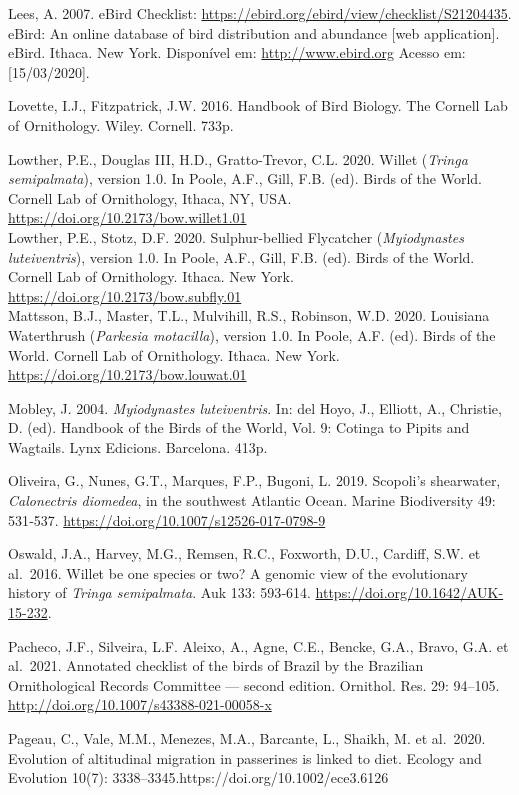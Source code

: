 \documentclass[
  oneside]{scrbook}
\begin{document}
Lees, A. 2007. eBird Checklist: \url{https://ebird.org/ebird/view/checklist/S21204435}. eBird: An online database of bird distribution and abundance {[}web application{]}. eBird. Ithaca. New York. Disponível em: \url{http://www.ebird.org} Acesso em: {[}15/03/2020{]}.

Lovette, I.J., Fitzpatrick, J.W. 2016. Handbook of Bird Biology. The Cornell Lab of
Ornithology. Wiley. Cornell. 733p.

Lowther, P.E., Douglas III, H.D., Gratto-Trevor, C.L. 2020. Willet (\emph{Tringa semipalmata}), version 1.0. In Poole, A.F., Gill, F.B. (ed). Birds of the World. Cornell Lab of Ornithology, Ithaca, NY, USA. \url{https://doi.org/10.2173/bow.willet1.01}\\
Lowther, P.E., Stotz, D.F. 2020. Sulphur-bellied Flycatcher (\emph{Myiodynastes luteiventris}), version 1.0. In Poole, A.F., Gill, F.B. (ed). Birds of the World. Cornell Lab of Ornithology. Ithaca. New York. \url{https://doi.org/10.2173/bow.subfly.01}\\
Mattsson, B.J., Master, T.L., Mulvihill, R.S., Robinson, W.D. 2020. Louisiana Waterthrush (\emph{Parkesia motacilla}), version 1.0. In Poole, A.F. (ed). Birds of the World. Cornell Lab of Ornithology. Ithaca. New York. \url{https://doi.org/10.2173/bow.louwat.01}

Mobley, J. 2004. \emph{Myiodynastes luteiventris}. In: del Hoyo, J., Elliott, A., Christie, D. (ed). Handbook of the Birds of the World, Vol. 9: Cotinga to Pipits and Wagtails. Lynx Edicions. Barcelona. 413p.

Oliveira, G., Nunes, G.T., Marques, F.P., Bugoni, L. 2019. Scopoli's shearwater, \emph{Calonectris diomedea}, in the southwest Atlantic Ocean. Marine Biodiversity 49: 531‑537. \url{https://doi.org/10.1007/s12526-017-0798-9}

Oswald, J.A., Harvey, M.G., Remsen, R.C., Foxworth, D.U., Cardiff, S.W. et al.~2016. Willet be one species or two? A genomic view of the evolutionary history of \emph{Tringa semipalmata}. Auk 133: 593‑614. \url{https://doi.org/10.1642/AUK-15-232}.

Pacheco, J.F., Silveira, L.F. Aleixo, A., Agne, C.E., Bencke, G.A., Bravo, G.A. et al.~2021. Annotated checklist of the birds of Brazil by the Brazilian Ornithological Records Committee --- second edition. Ornithol. Res. 29: 94--105. \url{http://doi.org/10.1007/s43388-021-00058-x}

Pageau, C., Vale, M.M., Menezes, M.A., Barcante, L., Shaikh, M. et al.~2020. Evolution of altitudinal migration in passerines is linked to diet. Ecology and Evolution 10(7): 3338--3345.https://doi.org/10.1002/ece3.6126
\end{document}
